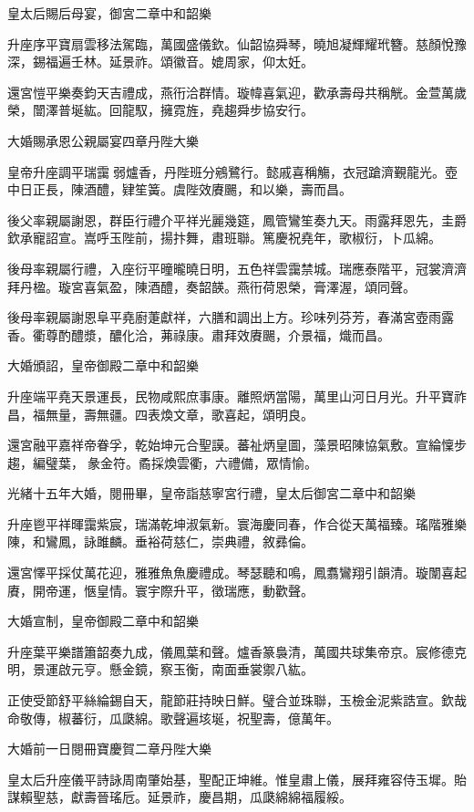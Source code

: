 \begin{pinyinscope}
皇太后賜后母宴，御宮二章中和韶樂

升座序平寶扇雲移法駕臨，萬國盛儀欽。仙韶協舜琴，曉旭凝輝耀玳簪。慈顏悅豫深，錫福遍壬林。延景祚。頌徽音。媲周家，仰太妊。

還宮愷平樂奏鈞天吉禮成，燕衎洽群情。璇幃喜氣迎，歡承壽母共稱觥。金萱萬歲榮，闓澤普埏紘。回龍馭，擁霓旌，堯趨舜步協安行。

大婚賜承恩公親屬宴四章丹陛大樂

皇帝升座調平瑞靄弱爐香，丹陛班分鵷鷺行。懿戚喜稱觴，衣冠蹌濟覲龍光。壺中日正長，陳酒醴，肄笙簧。虞陛效賡颺，和以樂，壽而昌。

後父率親屬謝恩，群臣行禮介平祥光麗幾筵，鳳管鸞笙奏九天。雨露拜恩先，圭爵欽承寵詔宣。嵩呼玉陛前，揚抃舞，肅班聯。篤慶祝堯年，歌椒衍，卜瓜綿。

後母率親屬行禮，入座衍平曈曨曉日明，五色祥雲靄禁城。瑞應泰階平，冠裳濟濟拜丹楹。璇宮喜氣盈，陳酒醴，奏韶韺。燕衎荷恩榮，膏澤渥，頌同聲。

後母率親屬謝恩阜平堯廚萐獻祥，六膳和調出上方。珍味列芬芳，春滿宮壺雨露香。衢尊酌醴漿，醲化洽，茀祿康。肅拜效賡颺，介景福，熾而昌。

大婚頒詔，皇帝御殿二章中和韶樂

升座端平堯天景運長，民物咸熙庶事康。離照炳當陽，萬里山河日月光。升平寶祚昌，福無量，壽無疆。四表煥文章，歌喜起，頌明良。

還宮融平嘉祥帝眷孚，乾始坤元合聖謨。蕃祉炳皇圖，藻景昭陳協氣敷。宣綸懍步趨，編璧葉，彖金符。矞採煥雲衢，六禮備，眾情愉。

光緒十五年大婚，閱冊畢，皇帝詣慈寧宮行禮，皇太后御宮二章中和韶樂

升座鬯平祥暉靄紫宸，瑞滿乾坤淑氣新。寰海慶同春，作合從天萬福臻。瑤階雅樂陳，和鸞鳳，詠雎麟。垂裕荷慈仁，崇典禮，敘彞倫。

還宮懌平採仗萬花迎，雅雅魚魚慶禮成。琴瑟聽和鳴，鳳翥鸞翔引韻清。璇闈喜起賡，開帝運，愜皇情。寰宇際升平，徵瑞應，動歡聲。

大婚宣制，皇帝御殿二章中和韶樂

升座葉平樂譜簫韶奏九成，儀鳳葉和聲。爐香篆裊清，萬國共球集帝京。宸修德克明，景運啟元亨。懸金鏡，察玉衡，南面垂裳禦八紘。

正使受節舒平絲綸錫自天，龍節莊持映日鮮。璧合並珠聯，玉檢金泥紫誥宣。欽哉命敬傳，椒蕃衍，瓜瓞綿。歌聲遍垓埏，祝聖壽，億萬年。

大婚前一日閱冊寶慶賀二章丹陛大樂

皇太后升座儀平詩詠周南肇始基，聖配正坤維。惟皇肅上儀，展拜雍容侍玉墀。貽謀賴聖慈，獻壽晉瑤卮。延景祚，慶昌期，瓜瓞綿綿福履綏。


\end{pinyinscope}

